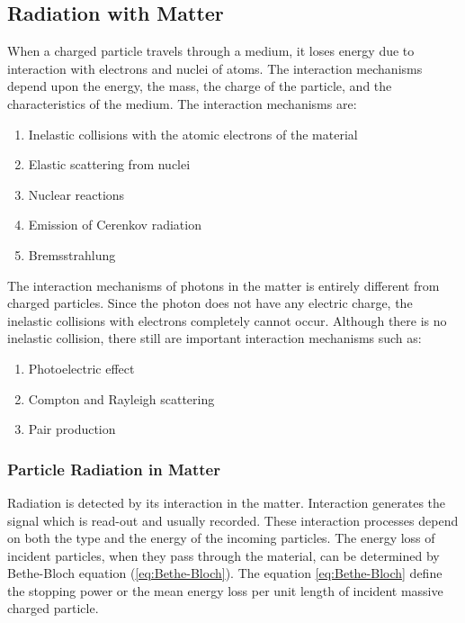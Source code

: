 \documentclass[12pt,a4paper]{article}
\begin{document}
\subsection{Radiation with Matter}

When a charged particle travels through  a medium, it loses energy due to interaction with  electrons and nuclei of atoms.     The interaction mechanisms depend upon the energy, the mass, the charge of the particle, and the characteristics of the medium. The interaction mechanisms are:

\begin{enumerate}
    \item Inelastic collisions with the atomic electrons of the material
    \item Elastic scattering from nuclei
    \item Nuclear reactions
    \item Emission of Cerenkov radiation
    \item Bremsstrahlung
\end{enumerate}

The interaction mechanisms of photons in the matter is entirely different from charged particles. Since the
photon does not have any electric charge, the inelastic collisions with electrons completely cannot occur. 
Although there is no inelastic collision, there still are important interaction mechanisms such as:

\begin{enumerate}
    \item Photoelectric effect
    \item Compton and Rayleigh scattering
    \item Pair production
\end{enumerate}

\subsubsection{Particle Radiation in Matter}

Radiation is detected by its interaction in the matter.  Interaction generates the signal which is read-out
and usually recorded. These interaction processes depend on both the type and the energy of the incoming
particles. The energy loss of incident particles, when they pass through the material,  can be determined by Bethe-Bloch equation (\ref{eq:Bethe-Bloch}). The equation \ref{eq:Bethe-Bloch} define the stopping power or the mean energy loss per unit length of incident massive charged particle.
\end{document}
